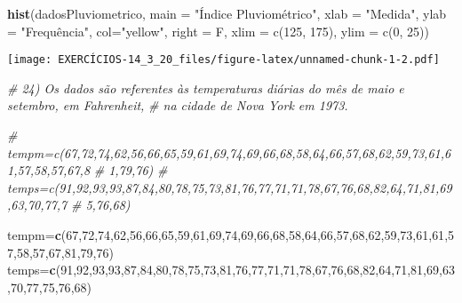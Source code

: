 \documentclass[]{article}
\newenvironment{Shaded}{\begin{snugshade}}{\end{snugshade}}
\newcommand{\CommentTok}[1]{\textcolor[rgb]{0.56,0.35,0.01}{\textit{#1}}}
\newcommand{\DataTypeTok}[1]{\textcolor[rgb]{0.13,0.29,0.53}{#1}}
\newcommand{\DecValTok}[1]{\textcolor[rgb]{0.00,0.00,0.81}{#1}}
\newcommand{\KeywordTok}[1]{\textcolor[rgb]{0.13,0.29,0.53}{\textbf{#1}}}
\newcommand{\NormalTok}[1]{#1}
\newcommand{\StringTok}[1]{\textcolor[rgb]{0.31,0.60,0.02}{#1}}
\begin{document}
\begin{Shaded}
\begin{Highlighting}[]
\KeywordTok{hist}\NormalTok{(dadosPluviometrico,}
     \DataTypeTok{main =} \StringTok{"Índice Pluviométrico"}\NormalTok{,}
     \DataTypeTok{xlab =} \StringTok{"Medida"}\NormalTok{,}
     \DataTypeTok{ylab =} \StringTok{"Frequência",}
\StringTok{     col="}\NormalTok{yellow}\StringTok{",}
\StringTok{     right = F,}
\StringTok{     xlim = c(125, 175),}
\StringTok{     ylim = c(0, 25))}
\end{Highlighting}
\end{Shaded}

\texttt{[image: EXERCÍCIOS-14\_3\_20\_files/figure-latex/unnamed-chunk-1-2.pdf]}

\begin{Shaded}
\begin{Highlighting}[]
\CommentTok{# 24) Os dados são referentes às temperaturas diárias do mês de maio e setembro, em Fahrenheit,}
\CommentTok{# na cidade de Nova York em 1973.}

\CommentTok{# tempm=c(67,72,74,62,56,66,65,59,61,69,74,69,66,68,58,64,66,57,68,62,59,73,61,61,57,58,57,67,8}
\CommentTok{#         1,79,76)}
\CommentTok{# temps=c(91,92,93,93,87,84,80,78,75,73,81,76,77,71,71,78,67,76,68,82,64,71,81,69,63,70,77,7}
\CommentTok{#         5,76,68)}

\NormalTok{tempm=}\KeywordTok{c}\NormalTok{(}\DecValTok{67}\NormalTok{,}\DecValTok{72}\NormalTok{,}\DecValTok{74}\NormalTok{,}\DecValTok{62}\NormalTok{,}\DecValTok{56}\NormalTok{,}\DecValTok{66}\NormalTok{,}\DecValTok{65}\NormalTok{,}\DecValTok{59}\NormalTok{,}\DecValTok{61}\NormalTok{,}\DecValTok{69}\NormalTok{,}\DecValTok{74}\NormalTok{,}\DecValTok{69}\NormalTok{,}\DecValTok{66}\NormalTok{,}\DecValTok{68}\NormalTok{,}\DecValTok{58}\NormalTok{,}\DecValTok{64}\NormalTok{,}\DecValTok{66}\NormalTok{,}\DecValTok{57}\NormalTok{,}\DecValTok{68}\NormalTok{,}\DecValTok{62}\NormalTok{,}\DecValTok{59}\NormalTok{,}\DecValTok{73}\NormalTok{,}\DecValTok{61}\NormalTok{,}\DecValTok{61}\NormalTok{,}\DecValTok{57}\NormalTok{,}\DecValTok{58}\NormalTok{,}\DecValTok{57}\NormalTok{,}\DecValTok{67}\NormalTok{,}\DecValTok{81}\NormalTok{,}\DecValTok{79}\NormalTok{,}\DecValTok{76}\NormalTok{)}
\NormalTok{temps=}\KeywordTok{c}\NormalTok{(}\DecValTok{91}\NormalTok{,}\DecValTok{92}\NormalTok{,}\DecValTok{93}\NormalTok{,}\DecValTok{93}\NormalTok{,}\DecValTok{87}\NormalTok{,}\DecValTok{84}\NormalTok{,}\DecValTok{80}\NormalTok{,}\DecValTok{78}\NormalTok{,}\DecValTok{75}\NormalTok{,}\DecValTok{73}\NormalTok{,}\DecValTok{81}\NormalTok{,}\DecValTok{76}\NormalTok{,}\DecValTok{77}\NormalTok{,}\DecValTok{71}\NormalTok{,}\DecValTok{71}\NormalTok{,}\DecValTok{78}\NormalTok{,}\DecValTok{67}\NormalTok{,}\DecValTok{76}\NormalTok{,}\DecValTok{68}\NormalTok{,}\DecValTok{82}\NormalTok{,}\DecValTok{64}\NormalTok{,}\DecValTok{71}\NormalTok{,}\DecValTok{81}\NormalTok{,}\DecValTok{69}\NormalTok{,}\DecValTok{63}\NormalTok{,}\DecValTok{70}\NormalTok{,}\DecValTok{77}\NormalTok{,}\DecValTok{75}\NormalTok{,}\DecValTok{76}\NormalTok{,}\DecValTok{68}\NormalTok{)}


\end{Highlighting}
\end{Shaded}
\end{document}
